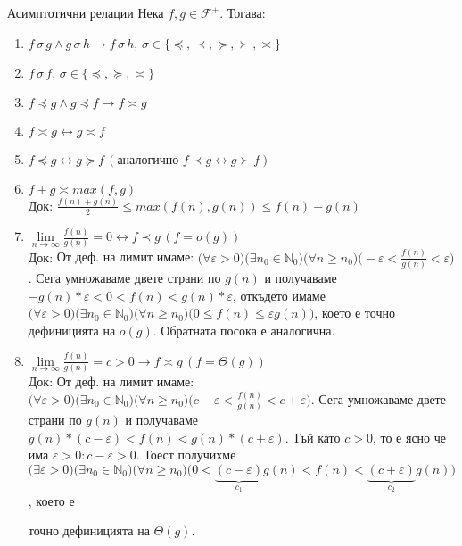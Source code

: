 \begin{boxmainproperties}{Асимптотични релации}{}\label{mprop-1}
Нека $f,g\in\mathscr{F}^+$. Тогава:
	\begin{enumerate}
		\item $f\,\sigma\,g\land g\,\sigma\,h\rightarrow f\,\sigma\,h,\,\sigma\in\{\preccurlyeq,\prec,\succcurlyeq,\succ,\asymp\}$
		\item $f\,\sigma\,f,\,\sigma\in\{\preccurlyeq,\succcurlyeq,\asymp\}$
		\item $f\preccurlyeq g\land g\preccurlyeq f\rightarrow f\asymp g$
		\item $f\asymp g\leftrightarrow g\asymp f$
		\item $f\preccurlyeq g\leftrightarrow g\succcurlyeq f\,(\text{аналогично }f\prec g\leftrightarrow g\succ f)$
		\item $f+g\asymp max(f,g)$\\
			  $\textbf{Док: }\frac{f(n)+g(n)}2\le max(f(n),g(n))\le f(n)+g(n)$
		\item $\lim\limits_{n\to\infty}\frac{f(n)}{g(n)}=0\leftrightarrow f\prec g\,(f=o(g))$\\
			  $\textbf{Док:}$ От деф. на лимит имаме: $\big(\forall\varepsilon>0\big)\big(\exists n_0\in\mathbb{N}_0\big)\big(\forall n\ge n_0\big)\big(-\varepsilon<\frac{f(n)}{g(n)}<\varepsilon\big)$. Сега умножаваме двете страни по $g(n)$ и получаваме $-g(n)*\varepsilon<0<f(n)<g(n)*\varepsilon$, откъдето имаме $\big(\forall\varepsilon>0\big)\big(\exists n_0\in\mathbb{N}_0\big)\big(\forall n\ge n_0\big)\big(0\le f(n)\le\varepsilon g(n)\big)$, което е точно дефиницията на $\hyperref[bdef-asymp-classes]{o(g)}$. Обратната посока е аналогична.
		\item $\lim\limits_{n\to\infty}\frac{f(n)}{g(n)}=c>0\rightarrow f\asymp g\,(f=\Theta(g))$\\
			  $\textbf{Док:}$ От деф. на лимит имаме: $\big(\forall\varepsilon>0\big)\big(\exists n_0\in\mathbb{N}_0\big)\big(\forall n\ge n_0\big)\big(c-\varepsilon<\frac{f(n)}{g(n)}<c+\varepsilon\big)$. Сега умножаваме двете страни по $g(n)$ и получаваме $g(n)*(c-\varepsilon)<f(n)<g(n)*(c+\varepsilon)$. Тъй като $c>0$, то е ясно че има $\varepsilon>0:c-\varepsilon>0$. Тоест получихме $\big(\exists\varepsilon>0\big)\big(\exists n_0\in\mathbb{N}_0\big)\big(\forall n\ge n_0\big)\big(0<\underbrace{(c-\varepsilon)}_{c_1}g(n)<f(n)<\underbrace{(c+\varepsilon)}_{c_2}g(n)\big)$, което е
			  \vspace{-0.72cm}%
			  
			  точно дефиницията на $\hyperref[bdef-asymp-classes]{\Theta(g)}$.
			  \vspace{-0.15cm}
			  

\end{enumerate}
\end{boxmainproperties}
